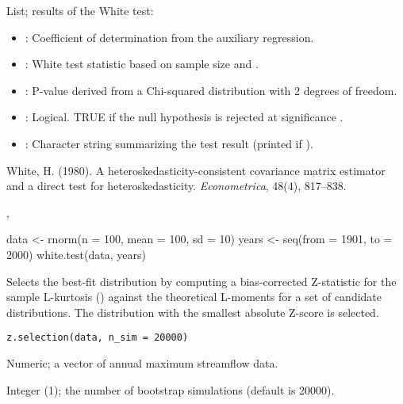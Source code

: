 \documentclass[a4paper]{book}
\begin{document}
\begin{Value}
List; results of the White test:
\begin{itemize}

\item{} : Coefficient of determination from the auxiliary regression.
\item{} : White test statistic based on sample size and .
\item{} : P-value derived from a Chi-squared distribution with 2 degrees of freedom.
\item{} : Logical. TRUE if the null hypothesis is rejected at significance .
\item{} : Character string summarizing the test result (printed if ).

\end{itemize}

\end{Value}
%
\begin{References}
White, H. (1980). A heteroskedasticity-consistent covariance matrix
estimator and a direct test for heteroskedasticity. \emph{Econometrica}, 48(4), 817–838.
\end{References}
%
\begin{SeeAlso}
, 
\end{SeeAlso}
%
\begin{Examples}
\begin{ExampleCode}
data <- rnorm(n = 100, mean = 100, sd = 10)
years <- seq(from = 1901, to = 2000)
white.test(data, years)

\end{ExampleCode}
\end{Examples}
%
\begin{Description}
Selects the best-fit distribution by computing a bias-corrected Z-statistic for the sample
L-kurtosis () against the theoretical L-moments for a set of candidate
distributions. The distribution with the smallest absolute Z-score is selected.
\end{Description}
%
\begin{Usage}
\begin{verbatim}
z.selection(data, n_sim = 20000)
\end{verbatim}
\end{Usage}
%
\begin{Arguments}
\begin{ldescription}
\item[\code{data}] Numeric; a vector of annual maximum streamflow data.

\item[\code{n\_sim}] Integer (1); the number of bootstrap simulations (default is 20000).
\end{ldescription}
\end{Arguments}
\end{document}
